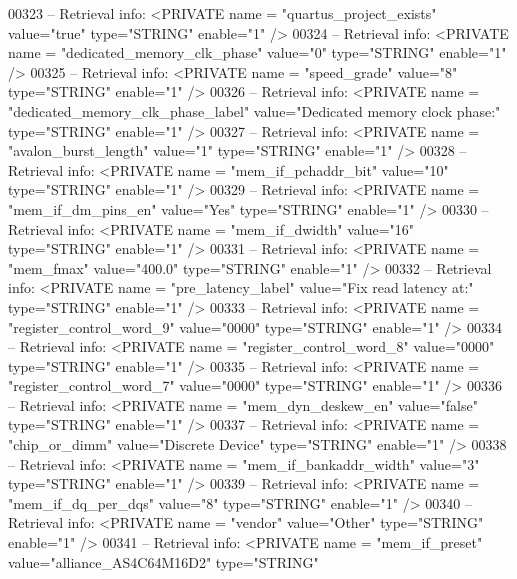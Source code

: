 \begin{DoxyCode}
{00323 \textcolor{keyword}{-- Retrieval info:      <PRIVATE name = "quartus\_project\_exists" value="true"  type="STRING"  enable="1" />}
00324 \textcolor{keyword}{-- Retrieval info:      <PRIVATE name = "dedicated\_memory\_clk\_phase" value="0"  type="STRING"  enable="1"
       />}
00325 \textcolor{keyword}{-- Retrieval info:      <PRIVATE name = "speed\_grade" value="8"  type="STRING"  enable="1" />}
00326 \textcolor{keyword}{-- Retrieval info:      <PRIVATE name = "dedicated\_memory\_clk\_phase\_label" value="Dedicated memory clock
       phase:"  type="STRING"  enable="1" />}
00327 \textcolor{keyword}{-- Retrieval info:      <PRIVATE name = "avalon\_burst\_length" value="1"  type="STRING"  enable="1" />}
00328 \textcolor{keyword}{-- Retrieval info:      <PRIVATE name = "mem\_if\_pchaddr\_bit" value="10"  type="STRING"  enable="1" />}
00329 \textcolor{keyword}{-- Retrieval info:      <PRIVATE name = "mem\_if\_dm\_pins\_en" value="Yes"  type="STRING"  enable="1" />}
00330 \textcolor{keyword}{-- Retrieval info:      <PRIVATE name = "mem\_if\_dwidth" value="16"  type="STRING"  enable="1" />}
00331 \textcolor{keyword}{-- Retrieval info:      <PRIVATE name = "mem\_fmax" value="400.0"  type="STRING"  enable="1" />}
00332 \textcolor{keyword}{-- Retrieval info:      <PRIVATE name = "pre\_latency\_label" value="Fix read latency at:"  type="STRING" 
       enable="1" />}
00333 \textcolor{keyword}{-- Retrieval info:      <PRIVATE name = "register\_control\_word\_9" value="0000"  type="STRING"  enable="1"
       />}
00334 \textcolor{keyword}{-- Retrieval info:      <PRIVATE name = "register\_control\_word\_8" value="0000"  type="STRING"  enable="1"
       />}
00335 \textcolor{keyword}{-- Retrieval info:      <PRIVATE name = "register\_control\_word\_7" value="0000"  type="STRING"  enable="1"
       />}
00336 \textcolor{keyword}{-- Retrieval info:      <PRIVATE name = "mem\_dyn\_deskew\_en" value="false"  type="STRING"  enable="1" />}
00337 \textcolor{keyword}{-- Retrieval info:      <PRIVATE name = "chip\_or\_dimm" value="Discrete Device"  type="STRING"  enable="1"
       />}
00338 \textcolor{keyword}{-- Retrieval info:      <PRIVATE name = "mem\_if\_bankaddr\_width" value="3"  type="STRING"  enable="1" />}
00339 \textcolor{keyword}{-- Retrieval info:      <PRIVATE name = "mem\_if\_dq\_per\_dqs" value="8"  type="STRING"  enable="1" />}
00340 \textcolor{keyword}{-- Retrieval info:      <PRIVATE name = "vendor" value="Other"  type="STRING"  enable="1" />}
00341 \textcolor{keyword}{-- Retrieval info:      <PRIVATE name = "mem\_if\_preset" value="alliance\_AS4C64M16D2"  type="STRING" 
}}
\end{DoxyCode}
